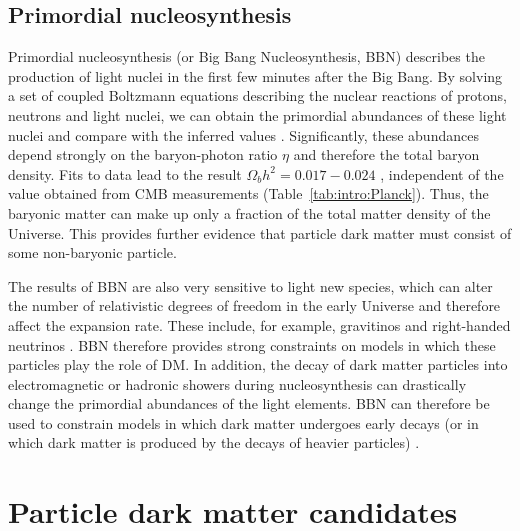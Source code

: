 \subsection{Primordial nucleosynthesis}


Primordial nucleosynthesis (or Big Bang Nucleosynthesis, BBN) describes the production of light nuclei in the first few minutes after the Big Bang. By solving a set of coupled Boltzmann equations describing the nuclear reactions of protons, neutrons and light nuclei, we can obtain the primordial abundances of these light nuclei and compare with the inferred values \cite{Tytler:2000}. Significantly, these abundances depend strongly on the baryon-photon ratio $\eta$ and therefore the total baryon density. Fits to data lead to the result $\Omega_b h^2 = 0.017 - 0.024$ \cite{Fields:2006}, independent of the value obtained from CMB measurements (Table~\ref{tab:intro:Planck}). Thus, the baryonic matter can make up only a fraction of the total matter density of the Universe. This provides further evidence that particle dark matter must consist of some non-baryonic particle.


The results of BBN are also very sensitive to light new species, which can alter the number of relativistic degrees of freedom in the early Universe and therefore affect the expansion rate. These include, for example, gravitinos \cite{Maggiore:2000} and right-handed neutrinos \cite{Cyburt:2005}. BBN therefore provides strong constraints on models in which these particles play the role of DM. In addition, the decay of dark matter particles into electromagnetic or hadronic showers during nucleosynthesis can drastically change the primordial abundances of the light elements. BBN can therefore be used to constrain models in which dark matter undergoes early decays (or in which dark matter is produced by the decays of heavier particles) \cite{Jedamzik:2006}.


\section{Particle dark matter candidates}
\label{intro:sec:candidates}

